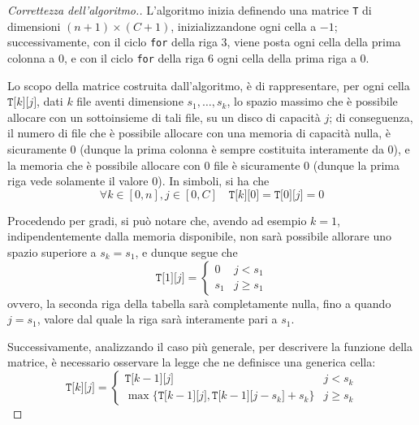 \documentclass[a4paper, 12pt]{report}
\begin{document}
    \begin{proof}[Correttezza dell'algoritmo.]
        L'algoritmo inizia definendo una matrice \texttt{T} di dimensioni $(n + 1) \times (C + 1)$, inizializzandone ogni cella a $-1$; successivamente, con il ciclo \texttt{for} della riga 3, viene posta ogni cella della prima colonna a 0, e con il ciclo \texttt{for} della riga 6 ogni cella della prima riga a 0.

        Lo scopo della matrice costruita dall'algoritmo, è di rappresentare, per ogni cella $\texttt{T[}k\texttt{][}j\texttt{]}$, dati $k$ file aventi dimensione $s_1, \ldots, s_k$, lo spazio massimo che è possibile allocare con un sottoinsieme di tali file, su un disco di capacità $j$; di conseguenza, il numero di file che è possibile allocare con una memoria di capacità nulla, è sicuramente 0 (dunque la prima colonna è sempre costituita interamente da 0), e la memoria che è possibile allocare con 0 file è sicuramente 0 (dunque la prima riga vede solamente il valore 0). In simboli, si ha che $$\forall k \in [0, n], j \in [0, C] \quad \texttt{T[}k\texttt{][}0\texttt{]} = \texttt{T[}0\texttt{][}j\texttt{]} = 0$$

        Procedendo per gradi, si può notare che, avendo ad esempio $k = 1$, indipendentemente dalla memoria disponibile, non sarà possibile allorare uno spazio superiore a $s_k = s_1$, e dunque segue che $$\texttt{T[}1\texttt{][}j\texttt{]}= \left \{ \begin{array}{ll} 0 & j < s_1 \\ s_1 & j \ge s_1 \end{array} \right.$$ ovvero, la seconda riga della tabella sarà completamente nulla, fino a quando $j = s_1$, valore dal quale la riga sarà interamente pari a $s_1$.

        Successivamente, analizzando il caso più generale, per descrivere la funzione della matrice, è necessario osservare la legge che ne definisce una generica cella: $$\texttt{T[}k\texttt{][}j\texttt{]}=\left \{ \begin{array}{ll}\texttt{T[}k - 1\texttt{][}j\texttt{]} & j < s_k \\ \max\{\texttt{T[}k - 1\texttt{][}j\texttt{]}, \texttt{T[}k-1\texttt{][}j - s_k\texttt{]} + s_k\} & j \ge s_k \end{array} \right.$$


\end{proof}
\end{document}
